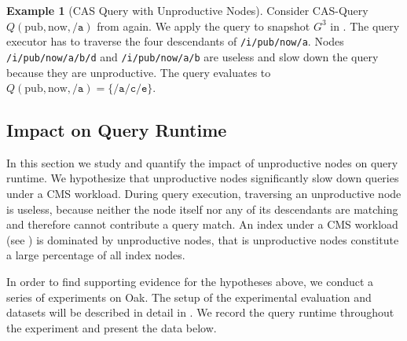 \documentclass[abstracton,12pt]{scrartcl}
\theoremstyle{definition}
\newtheorem{example}{Example}
\begin{document}
\begin{example}[CAS Query with Unproductive Nodes]
  Consider CAS-Query $Q(\text{pub},\text{now},\texttt{/a})$ from
   again. We apply the query to snapshot $G^3$ in
  . The query executor has to traverse the four
  descendants of \texttt{/i/pub/now/a}. Nodes
  \texttt{/i/pub/now/a/b/d} and \texttt{/i/pub/now/a/b} are useless and slow down the
  query because they are unproductive. The query evaluates to
  $Q(\text{pub},\text{now},\texttt{/a}) = \{\texttt{/a/c/e}\}$.
\end{example}

\subsection{Impact on Query Runtime}

In this section we study and quantify the impact of unproductive nodes on
query runtime. We hypothesize that unproductive nodes
significantly slow down queries under a CMS workload. During query
execution, traversing an unproductive node is
useless, because neither the node itself nor any of its descendants are matching
and therefore cannot contribute a query match.
An index under a CMS workload (see ) is dominated
by unproductive nodes, that is unproductive nodes constitute a large percentage
of all index nodes.



In order to find supporting evidence for the hypotheses above, we conduct a series of
experiments on Oak. The setup of the  experimental evaluation and
datasets will be described in detail in . We
record the query runtime throughout the experiment and present the data below.
\end{document}
